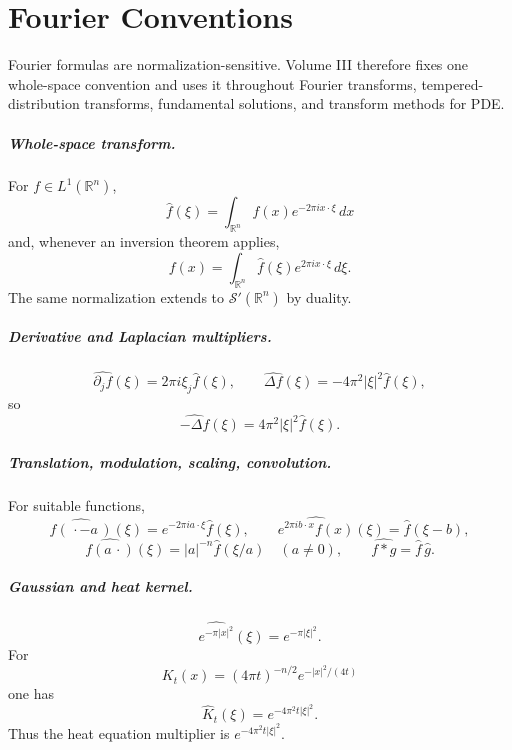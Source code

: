 \chapter*{Fourier Conventions}
\label{front:vol03-fourier-conventions}

Fourier formulas are normalization-sensitive. Volume III therefore fixes one
whole-space convention and uses it throughout Fourier transforms,
tempered-distribution transforms, fundamental solutions, and transform methods
for PDE.

\paragraph{Whole-space transform.}
For \(f\in L^1(\mathbb R^n)\),
\[
\boxed{
\widehat f(\xi)
=\int_{\mathbb R^n} f(x)e^{-2\pi i x\cdot\xi}\,dx
}
\]
and, whenever an inversion theorem applies,
\[
\boxed{
f(x)=\int_{\mathbb R^n}\widehat f(\xi)e^{2\pi i x\cdot\xi}\,d\xi.
}
\]
The same normalization extends to \(\mathcal S'(\mathbb R^n)\) by duality.

\paragraph{Derivative and Laplacian multipliers.}
\[
\widehat{\partial_j f}(\xi)
=2\pi i\xi_j\widehat f(\xi),
\qquad
\widehat{\Delta f}(\xi)
=-4\pi^2|\xi|^2\widehat f(\xi),
\]
so
\[
\boxed{\widehat{-\Delta f}(\xi)=4\pi^2|\xi|^2\widehat f(\xi).}
\]

\paragraph{Translation, modulation, scaling, convolution.}
For suitable functions,
\[
\widehat{f(\,\cdot-a\,)}(\xi)
=e^{-2\pi i a\cdot\xi}\widehat f(\xi),
\qquad
\widehat{e^{2\pi i b\cdot x}f(x)}(\xi)=\widehat f(\xi-b),
\]
\[
\widehat{f(a\,\cdot)}(\xi)=|a|^{-n}\widehat f(\xi/a)
\quad (a\ne0),
\qquad
\widehat{f*g}=\widehat f\,\widehat g.
\]

\paragraph{Gaussian and heat kernel.}
\[
\widehat{e^{-\pi|x|^2}}(\xi)=e^{-\pi|\xi|^2}.
\]
For
\[
K_t(x)=(4\pi t)^{-n/2}e^{-|x|^2/(4t)}
\]
one has
\[
\boxed{\widehat K_t(\xi)=e^{-4\pi^2t|\xi|^2}.}
\]
Thus the heat equation multiplier is \(e^{-4\pi^2t|\xi|^2}\).


